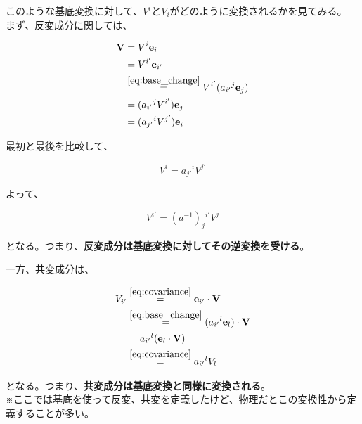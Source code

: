 \documentclass[a4paper,11pt]{article}
\begin{document}
\noindent
このような基底変換に対して、$V^i$と$V_i$がどのように変換されるかを見てみる。\\

まず、反変成分に関しては、

\begin{align}
  \mathbf{V} & = V^i \mathbf{e}_i                 \nonumber                                   \\
             & = V^{i'} \mathbf{e}_{i'}           \nonumber                                   \\
             & \overset{\eqref{eq:base_change}}{=} V^{i'} (a_{i'}{}^j \mathbf{e}_j) \nonumber \\
             & = (a_{i'}{}^j V^{i'}) \mathbf{e}_j \nonumber                                   \\
             & = (a_{j'}{}^i V^{j'}) \mathbf{e}_i
\end{align}

\noindent
最初と最後を比較して、

\begin{equation}
  V^i = a_{j'}{}^i V^{j'}
\end{equation}

\newpage
\noindent
よって、

\begin{equation}
  V^{i'} = (a^{-1})_{j}{}^{i'} V^{j}
\end{equation}

\noindent
となる。つまり、\textbf{反変成分は基底変換に対してその逆変換を受ける}。

一方、共変成分は、

\begin{align}
  V_{i'} & \overset{\eqref{eq:covariance}}{=} \mathbf{e}_{i'} \cdot \mathbf{V} \nonumber            \\
         & \overset{\eqref{eq:base_change}}{=} (a_{i'}{}^l \mathbf{e}_l) \cdot \mathbf{V} \nonumber \\
         & = a_{i'}{}^l (\mathbf{e}_{l} \cdot \mathbf{V}) \nonumber                                 \\
         & \overset{\eqref{eq:covariance}}{=} a_{i'}{}^l V_l
\end{align}

\noindent
となる。つまり、\textbf{共変成分は基底変換と同様に変換される}。\\

\noindent
※ここでは基底を使って反変、共変を定義したけど、物理だとこの変換性から定義することが多い。
\end{document}
